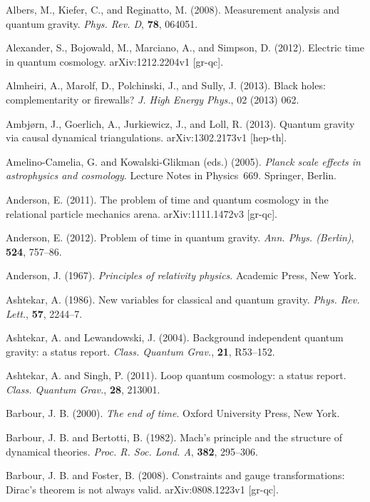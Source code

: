 \documentclass[12pt,a4paper]{article}
\begin{document}
\bibitem{} Albers, M., Kiefer, C., and Reginatto,
           M. (2008). Measurement analysis and quantum gravity. {\em
           Phys. Rev. D}, {\bf 78}, 064051.

\bibitem{} Alexander, S., Bojowald, M., Marciano, A., and Simpson,
  D. (2012). Electric time in quantum cosmology. arXiv:1212.2204v1
  [gr-qc].  

\bibitem{} Almheiri, A., Marolf, D., Polchinski, J., and Sully,
  J. (2013).  	
Black holes: complementarity or firewalls? {\em J. High Energy Phys.},
02 (2013) 062.

\bibitem{} Ambj\o rn, J., Goerlich, A., Jurkiewicz, J., and Loll,
  R. (2013). Quantum gravity via causal dynamical triangulations.
  arXiv:1302.2173v1 [hep-th].

\bibitem{} Amelino-Camelia, G. and Kowalski-Glikman (eds.) (2005).
           {\em Planck scale effects in astrophysics and cosmology}.
           Lecture Notes in Physics~669. Springer, Berlin.

\bibitem{} Anderson, E. (2011). The problem of time and quantum
  cosmology in the relational particle mechanics arena. 
  arXiv:1111.1472v3 [gr-qc].

\bibitem{} Anderson, E. (2012). Problem of time in quantum gravity. 
           {\em Ann. Phys. (Berlin)}, {\bf 524}, 757--86.

\bibitem{} Anderson, J. (1967). {\em Principles of relativity physics}.
           Academic Press, New York.

\bibitem{} Ashtekar, A. (1986). New variables for classical and quantum
           gravity. {\em Phys. Rev. Lett.}, {\bf 57}, 2244--7.

\bibitem{} Ashtekar, A. and Lewandowski, J. (2004).
           Background independent quantum gravity: a status report.
           {\em Class. Quantum Grav.}, {\bf 21}, R53--152.

\bibitem{} Ashtekar, A. and Singh, P. (2011).            	
Loop quantum cosmology: a status report.
{\em Class. Quantum Grav.}, {\bf 28}, 213001.

\bibitem{} Barbour, J. B. (2000). {\em The end of time}.
           Oxford University Press, New York.

\bibitem{} Barbour, J. B. and Bertotti, B. (1982). Mach's principle
           and the structure of dynamical theories.
           {\em Proc. R. Soc. Lond. A}, {\bf 382}, 295--306.  

\bibitem{} Barbour, J. B. and Foster, B. (2008).
           Constraints and gauge transformations: Dirac's theorem is
           not always valid. arXiv:0808.1223v1 [gr-qc].
\end{document}
